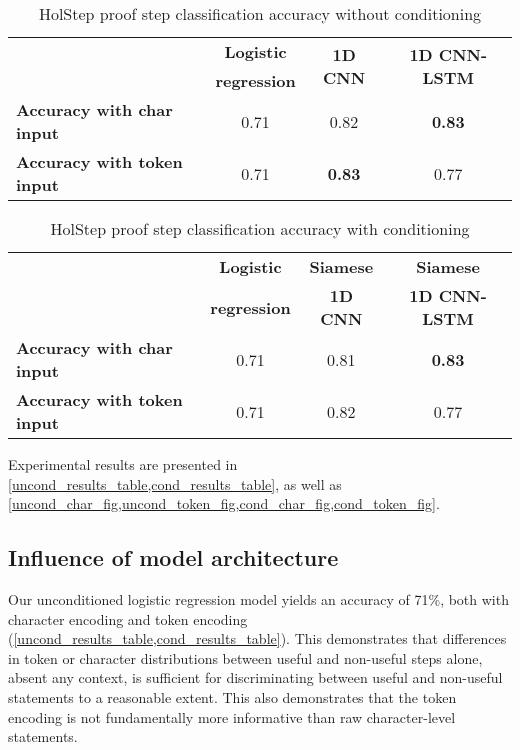 \documentclass[]{article}
\begin{document}
\begin{table}[]
\centering
\caption{HolStep proof step classification accuracy without conditioning}
\label{uncond_results_table}
\setlength{\tabcolsep}{3mm}
  \begin{tabular}{lccc}\toprule
                                    & \textbf{Logistic} & \multirow{2}{*}{\textbf{1D CNN}} &     \multirow{2}{*}{\textbf{1D CNN-LSTM}}   \\
& \textbf{regression} \\ \midrule
  \textbf{Accuracy with char input}     &         0.71            &      0.82             &      \textbf{0.83}         \\
  \textbf{Accuracy with token input}    &         0.71            &       \textbf{0.83}   &            0.77            \\ \bottomrule
  \end{tabular}
\end{table}

\begin{table}[]
\centering
\caption{HolStep proof step classification accuracy with conditioning}
\label{cond_results_table}
\setlength{\tabcolsep}{3mm}
  \begin{tabular}{lccc}
  \toprule
                                    & \textbf{Logistic } & \textbf{Siamese} & \textbf{Siamese}  \\
  & \textbf{regression} & \textbf{1D CNN} & \textbf{1D CNN-LSTM} \\ \midrule
  \textbf{Accuracy with char input}    &          0.71             &       0.81              &      \textbf{0.83}        \\
  \textbf{Accuracy with token input}   &          0.71             &        0.82             &            0.77           \\ \bottomrule
  \end{tabular}
\end{table}

Experimental results are presented in \cref{uncond_results_table,cond_results_table}, as well as \cref{uncond_char_fig,uncond_token_fig,cond_char_fig,cond_token_fig}.

\subsection{Influence of model architecture}

Our unconditioned logistic regression model yields an accuracy of 71\%,
both with character encoding and token encoding (\cref{uncond_results_table,cond_results_table}).
This demonstrates that differences in token or character distributions between useful and
non-useful steps alone, absent any context, is sufficient for
discriminating between useful and non-useful statements to a reasonable
extent. This also demonstrates that the token encoding is not
fundamentally more informative than raw character-level statements.
\end{document}
